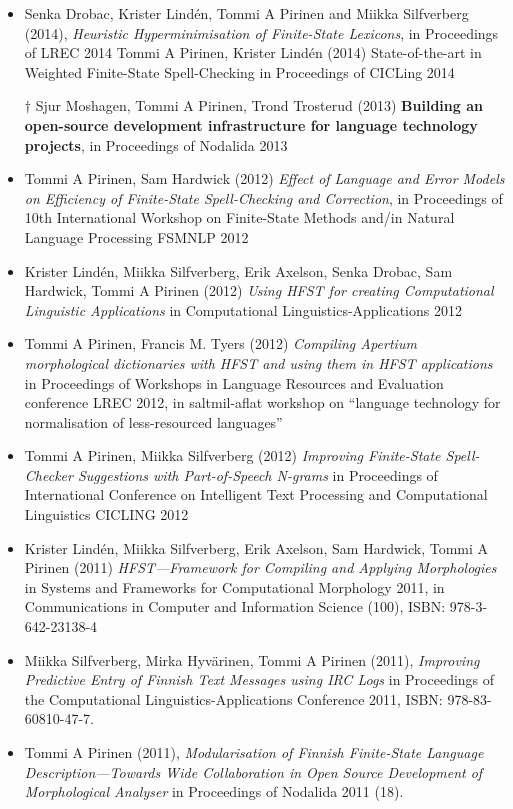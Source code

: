 \documentclass[a4paper]{article}
\begin{document}
\begin{itemize}
\item Senka Drobac, Krister Lindén, Tommi A Pirinen and Miikka Silfverberg (2014), \textit{Heuristic Hyperminimisation of Finite-State Lexicons}, in Proceedings of LREC 2014
Tommi A Pirinen, Krister Lindén (2014) State-of-the-art in Weighted Finite-State Spell-Checking in Proceedings of CICLing 2014
\item[$\dagger$] Sjur Moshagen, Tommi A Pirinen, Trond Trosterud (2013) \textbf{Building an open-source development infrastructure for language technology projects}, in Proceedings of Nodalida 2013
\item Tommi A Pirinen, Sam Hardwick (2012) \textit{Effect of Language and Error Models on Efficiency of Finite-State Spell-Checking and Correction}, in Proceedings of 10th International Workshop on Finite-State Methods and/in Natural Language Processing FSMNLP 2012
\item Krister Lindén, Miikka Silfverberg, Erik Axelson, Senka Drobac, Sam Hardwick, Tommi A Pirinen (2012) \textit{Using HFST for creating Computational Linguistic Applications} in Computational Linguistics-Applications 2012
\item Tommi A Pirinen, Francis M. Tyers (2012) \textit{Compiling Apertium morphological dictionaries with HFST and using them in HFST applications} in Proceedings of Workshops in Language Resources and Evaluation conference LREC 2012, in saltmil-aflat workshop on “language technology for normalisation of less-resourced languages”
\item Tommi A Pirinen, Miikka Silfverberg (2012) \textit{Improving Finite-State Spell-Checker Suggestions with Part-of-Speech N-grams} in Proceedings of International Conference on Intelligent Text Processing and Computational Linguistics CICLING 2012
\item Krister Lindén, Miikka Silfverberg, Erik Axelson, Sam Hardwick, Tommi A Pirinen (2011) \textit{HFST—Framework for Compiling and Applying Morphologies} in Systems and Frameworks for Computational Morphology 2011, in Communications in Computer and Information Science (100), ISBN: 978-3-642-23138-4
\item Miikka Silfverberg, Mirka Hyvärinen, Tommi A Pirinen (2011), \textit{Improving Predictive Entry of Finnish Text Messages using IRC Logs} in Proceedings of the Computational Linguistics-Applications Conference 2011, ISBN: 978-83-60810-47-7.
\item Tommi A Pirinen (2011), \textit{Modularisation of Finnish Finite-State Language Descrip\-tion—Towards Wide Collaboration in Open Source Development of Morphological Analyser} in Proceedings of Nodalida 2011 (18).

\end{itemize}
\end{document}

